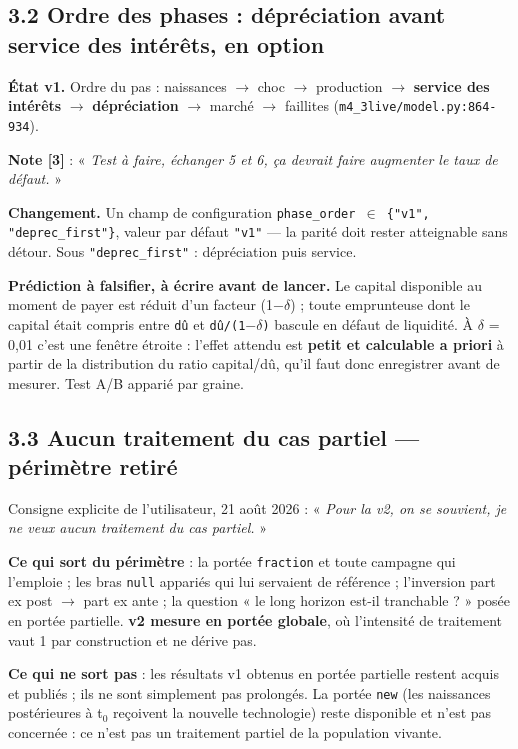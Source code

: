 \documentclass[11pt,a4paper]{article}
\newcommand{\code}[1]{\texttt{#1}}
\begin{document}
\subsection*{3.2 Ordre des phases : dépréciation avant service des intérêts, en option}

\textbf{État v1.} Ordre du pas : naissances \ensuremath{\rightarrow} choc \ensuremath{\rightarrow} production \ensuremath{\rightarrow} \textbf{service des intérêts} \ensuremath{\rightarrow} \textbf{dépréciation} \ensuremath{\rightarrow} marché \ensuremath{\rightarrow} faillites (\code{m4\_3live/model.py:864-934}).

\textbf{Note [3]} : « \emph{Test à faire, échanger 5 et 6, ça devrait faire augmenter le taux de défaut.} »

\textbf{Changement.} Un champ de configuration \code{phase\_order \ensuremath{\in} \{"v1", "deprec\_first"\}}, valeur par défaut \code{"v1"} --- la parité doit rester atteignable sans détour. Sous \code{"deprec\_first"} : dépréciation puis service.

\textbf{Prédiction à falsifier, à écrire avant de lancer.} Le capital disponible au moment de payer est réduit d'un facteur (1\ensuremath{-}\ensuremath{\delta}) ; toute emprunteuse dont le capital était compris entre \code{dû} et \code{dû/(1\ensuremath{-}\ensuremath{\delta})} bascule en défaut de liquidité. À \ensuremath{\delta} = 0,01 c'est une fenêtre étroite : l'effet attendu est \textbf{petit et calculable a priori} à partir de la distribution du ratio capital/dû, qu'il faut donc enregistrer avant de mesurer. Test A/B apparié par graine.

\subsection*{3.3 Aucun traitement du cas partiel --- \textbf{périmètre retiré}}

Consigne explicite de l'utilisateur, 21 août 2026 : « \emph{Pour la v2, on se souvient, je ne veux aucun traitement du cas partiel.} »

\textbf{Ce qui sort du périmètre} : la portée \code{fraction} et toute campagne qui l'emploie ; les bras \code{null} appariés qui lui servaient de référence ; l'inversion part ex post \ensuremath{\rightarrow} part ex ante ; la question « le long horizon est-il tranchable ? » posée en portée partielle. \textbf{v2 mesure en portée globale}, où l'intensité de traitement vaut 1 par construction et ne dérive pas.

\textbf{Ce qui ne sort pas} : les résultats v1 obtenus en portée partielle restent acquis et publiés ; ils ne sont simplement pas prolongés. La portée \code{new} (les naissances postérieures à t\ensuremath{_0} reçoivent la nouvelle technologie) reste disponible et n'est pas concernée : ce n'est pas un traitement partiel de la population vivante.
\end{document}
